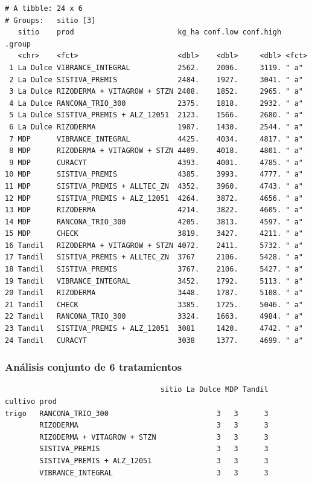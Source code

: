 \documentclass[
  letterpaper,
  DIV=11,
  numbers=noendperiod]{scrartcl}
\begin{document}
\begin{verbatim}
# A tibble: 24 x 6
# Groups:   sitio [3]
   sitio    prod                        kg_ha conf.low conf.high .group
   <chr>    <fct>                       <dbl>    <dbl>     <dbl> <fct> 
 1 La Dulce VIBRANCE_INTEGRAL           2562.    2006.     3119. " a"  
 2 La Dulce SISTIVA_PREMIS              2484.    1927.     3041. " a"  
 3 La Dulce RIZODERMA + VITAGROW + STZN 2408.    1852.     2965. " a"  
 4 La Dulce RANCONA_TRIO_300            2375.    1818.     2932. " a"  
 5 La Dulce SISTIVA_PREMIS + ALZ_12051  2123.    1566.     2680. " a"  
 6 La Dulce RIZODERMA                   1987.    1430.     2544. " a"  
 7 MDP      VIBRANCE_INTEGRAL           4425.    4034.     4817. " a"  
 8 MDP      RIZODERMA + VITAGROW + STZN 4409.    4018.     4801. " a"  
 9 MDP      CURACYT                     4393.    4001.     4785. " a"  
10 MDP      SISTIVA_PREMIS              4385.    3993.     4777. " a"  
11 MDP      SISTIVA_PREMIS + ALLTEC_ZN  4352.    3960.     4743. " a"  
12 MDP      SISTIVA_PREMIS + ALZ_12051  4264.    3872.     4656. " a"  
13 MDP      RIZODERMA                   4214.    3822.     4605. " a"  
14 MDP      RANCONA_TRIO_300            4205.    3813.     4597. " a"  
15 MDP      CHECK                       3819.    3427.     4211. " a"  
16 Tandil   RIZODERMA + VITAGROW + STZN 4072.    2411.     5732. " a"  
17 Tandil   SISTIVA_PREMIS + ALLTEC_ZN  3767     2106.     5428. " a"  
18 Tandil   SISTIVA_PREMIS              3767.    2106.     5427. " a"  
19 Tandil   VIBRANCE_INTEGRAL           3452.    1792.     5113. " a"  
20 Tandil   RIZODERMA                   3448.    1787.     5108. " a"  
21 Tandil   CHECK                       3385.    1725.     5046. " a"  
22 Tandil   RANCONA_TRIO_300            3324.    1663.     4984. " a"  
23 Tandil   SISTIVA_PREMIS + ALZ_12051  3081     1420.     4742. " a"  
24 Tandil   CURACYT                     3038     1377.     4699. " a"  
\end{verbatim}

\hypertarget{anuxe1lisis-conjunto-de-6-tratamientos-3}{%
\subsubsection{Análisis conjunto de 6
tratamientos}\label{anuxe1lisis-conjunto-de-6-tratamientos-3}}

\begin{verbatim}
                                    sitio La Dulce MDP Tandil
cultivo prod                                                 
trigo   RANCONA_TRIO_300                         3   3      3
        RIZODERMA                                3   3      3
        RIZODERMA + VITAGROW + STZN              3   3      3
        SISTIVA_PREMIS                           3   3      3
        SISTIVA_PREMIS + ALZ_12051               3   3      3
        VIBRANCE_INTEGRAL                        3   3      3
\end{verbatim}
\end{document}
